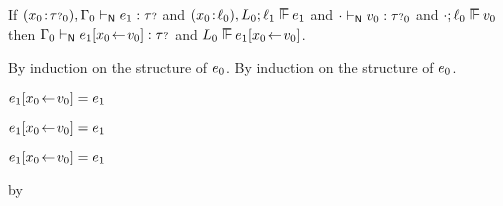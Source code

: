 \begin{lemma}\label{H-label-substitution}\leavevmode
  If\/ $(x_0\!:\!{\tau{\scriptstyle ?}}_0),\Gamma_0 \vdash_{\mathsf{N}} e_1 : {\tau{\scriptstyle ?}}$
  and\/ $\fcons{\tann{\svar_0}{\sowner_0}}\sownerenv_0; \sowner_1 \sWSOP \sexpr_1$
  and\/ ${\cdot} \vdash_{\mathsf{N}} v_0 : {\tau{\scriptstyle ?}}_0$
  and\/ $\snil; \sowner_0 \sWSOP \svalue_0$
  then\/ $\Gamma_0 \vdash_{\mathsf{N}} e_1[x_0\!\leftarrow\!v_0] : {\tau{\scriptstyle ?}}$
  and\/ $\sownerenv_0 \sWSOP \esubst{\sexpr_1}{\svar_0}{\svalue_0}$.
\end{lemma}{
  \newcommand{\shortproof}{By induction on the structure of $\sexpr_0$.}
\begin{lamportproof*}
  \shortproof
\mainproof
  \shortproof

    \begin{pfproof}
        \begin{pfproof}
          \qedstep
        \end{pfproof}
        \begin{pfproof}
          \qedstep
            \begin{pfproof}
              $e_1[x_0\!\leftarrow\!v_0] = e_1$
            \end{pfproof}
        \end{pfproof}
    \end{pfproof}

    \begin{pfproof}
      \qedstep
        \begin{pfproof}
          $e_1[x_0\!\leftarrow\!v_0] = e_1$
        \end{pfproof}
    \end{pfproof}

    \begin{pfproof}
        \begin{pfproof}
          \qedstep
            \begin{pfproof}
              $e_1[x_0\!\leftarrow\!v_0] = e_1$
            \end{pfproof}
        \end{pfproof}
        \begin{pfproof}
          \qedstep
            \begin{pfproof}
              by \pfih
            \end{pfproof}
        \end{pfproof}
    \end{pfproof}


\end{lamportproof*}}
